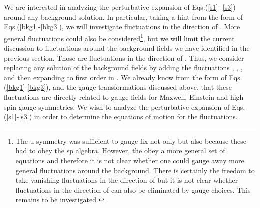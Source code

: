 \documentclass[a4paper,12pt]{article}
\begin{document}
We are interested in analyzing the perturbative expansion of Eqs.(\ref{s1}-%
\ref{s3}) around any background solution. In particular, taking a hint from
the form of Eqs.(\ref{bkg1}-\ref{bkg3}), we will investigate fluctuations \coordHE{} in the direction of \coordHE{}. More general
fluctuations could also be considered\footnote{%
The u\coordHE{} symmetry was sufficient to gauge fix
not only \coordHE{} but also \coordHE{} because these had to obey the sp\coordHE{} algebra. However, the \coordHE{} obey a more general set of
equations and therefore it is not clear whether one could gauge away more
general fluctuations around the background. There is certainly the freedom
to take vanishing fluctuations in the direction of \coordHE{} but it is not
clear whether fluctuations in the direction of \coordHE{} can also be
eliminated by gauge choices. This remains to be investigated.}, but we will
limit the current discussion to fluctuations around the background fields we
have identified in the previous section. Those are fluctuations in the
direction of \coordHE{}. Thus, we consider replacing any solution of the
background fields \coordHE{} by adding the fluctuations \coordHE{}, \coordHE{}, \coordHE{}, \coordHE{} and then expanding to first order in \coordHE{}. We already know from
the form of Eqs.(\ref{bkg1}-\ref{bkg3}), and the gauge transformations
discussed above, that these fluctuations are directly related to gauge
fields for Maxwell, Einstein and high spin gauge symmetries. We wish to
analyze the perturbative expansion of Eqs.(\ref{s1}-\ref{s3}) in order to
determine the equations of motion for the fluctuations.
\end{document}
